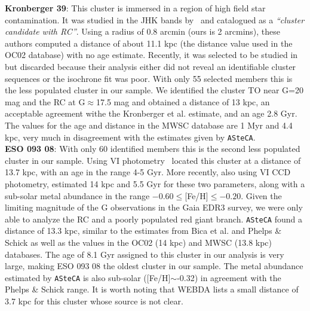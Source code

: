 \documentclass{aa}
\begin{document}
\begin{appendix}
  \noindent \textbf{Kronberger 39}: This cluster is immersed in a region of high field
  star contamination. It was studied in the JHK bands by~\cite{Kronberger_2006}
  and catalogued as a \emph{``cluster candidate with RC''}. Using a radius of 0.8
  arcmin (ours is 2 arcmins), these authors computed a distance of about 11.1
  kpc (the distance value used in the OC02 database) with no age estimate.
  Recently, it was selected to be studied in~\cite{Monteiro_2020} but
  discarded because their analysis either did not reveal an identifiable cluster
  sequences or the isochrone fit was poor.
  With only 55 selected members this is the less populated cluster in our
  sample. We identified the cluster TO near G=20 mag and the RC at
  G$\approx$17.5 mag and obtained a distance of 13 kpc, an acceptable
  agreement withe the Kronberger et al. estimate, and an age 2.8 Gyr.
  The values for the age and distance in the MWSC database are 1 Myr and 4.4
  kpc, very much in disagreement with the estimates given by \texttt{ASteCA}.\\

  \noindent \textbf{ESO 093 08}: With only 60 identified members this is the second less
  populated cluster in our sample. Using VI photometry~\cite{Bica_1999} located
  this cluster at a distance of 13.7 kpc, with an age in the range 4-5 Gyr.
  More recently, also using VI CCD photometry, \cite{Phelps_2003} estimated 14
  kpc and 5.5 Gyr for these two parameters, along with a sub-solar metal
  abundance in the range $-0.60\leq$[Fe/H]$\leq-0.20$.
  Given the limiting magnitude of the G observations in the Gaia EDR3 survey, we
  were only able to analyze the RC and a poorly populated red giant branch.
  \texttt{ASteCA} found a distance of 13.3 kpc, similar to the estimates from
  Bica et al. and Phelps \& Schick as well as the values in the OC02 (14 kpc)
  and MWSC (13.8 kpc) databases.
  The age of 8.1 Gyr assigned to this cluster in our analysis is very
  large, making ESO 093 08 the oldest cluster in our sample. The metal
  abundance estimated by \texttt{ASteCA} is also sub-solar ([Fe/H]$\sim$-0.32)
  in agreement with the Phelps \& Schick range. It is worth noting that WEBDA
  lists a small distance of 3.7 kpc for this cluster whose source is not
  clear.\\


\end{appendix}
\end{document}
